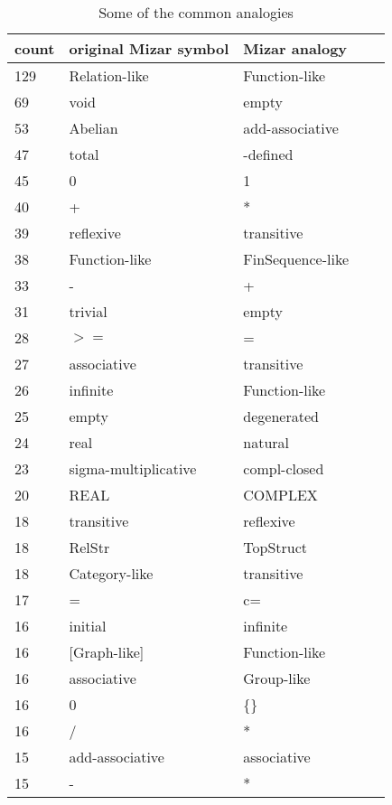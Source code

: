 \documentclass{ecai}
\begin{document}
\begin{table}
\begin{center}
\begin{scriptsize}
  \caption{\label{analogies} Some of the common analogies}
\centering
  \begin{tabular}{lllll}
    \toprule
count &   original Mizar symbol &  Mizar analogy \\ %
\midrule
   129& Relation-like&Function-like\\
     69&void&empty\\
     53&Abelian&add-associative\\
     47&total&-defined\\
     45&0&1\\
     40&+&*\\
     39&reflexive&transitive\\
     38&Function-like&FinSequence-like\\
     33&-&+\\
     31&trivial&empty\\
     28& $>=$&=\\
     27&associative&transitive\\
     26&infinite&Function-like\\
     25&empty&degenerated\\
     24&real&natural\\
     23&sigma-multiplicative&compl-closed\\
     20&REAL&COMPLEX\\
     18&transitive&reflexive\\
     18&RelStr&TopStruct\\
     18&Category-like&transitive\\
     17&=&c=\\
     16&initial&infinite\\
     16&[Graph-like]&Function-like\\
     16&associative&Group-like\\
     16&0&\{\}\\
     16&/&*\\
     15&add-associative&associative\\
     15&-&*\\

\end{tabular}
\end{scriptsize}
\end{center}
\end{table}
\end{document}
